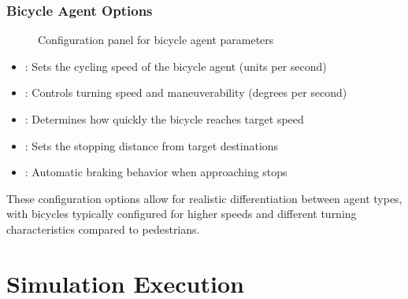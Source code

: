 \documentclass[letterpaper,10pt,english]{jupyterBook}
\begin{document}
\subsubsection{Bicycle Agent Options}
\label{\detokenize{The Simulation:bicycle-agent-options}}
\begin{figure}[htbp]
\centering
\capstart

\noindent{}
\caption{Configuration panel for bicycle agent parameters}\label{\detokenize{The Simulation:bicycle-options-panel}}\end{figure}
\begin{itemize}
\item {} 
\sphinxAtStartPar
{}: Sets the cycling speed of the bicycle agent (units per second)

\item {} 
\sphinxAtStartPar
{}: Controls turning speed and maneuverability (degrees per second)

\item {} 
\sphinxAtStartPar
{}: Determines how quickly the bicycle reaches target speed

\item {} 
\sphinxAtStartPar
{}: Sets the stopping distance from target destinations

\item {} 
\sphinxAtStartPar
{}: Automatic braking behavior when approaching stops

\end{itemize}

\sphinxAtStartPar
These configuration options allow for realistic differentiation between agent types, with bicycles typically configured for higher speeds and different turning characteristics compared to pedestrians.


\section{Simulation Execution}
\label{\detokenize{The Simulation:simulation-execution}}
\end{document}
